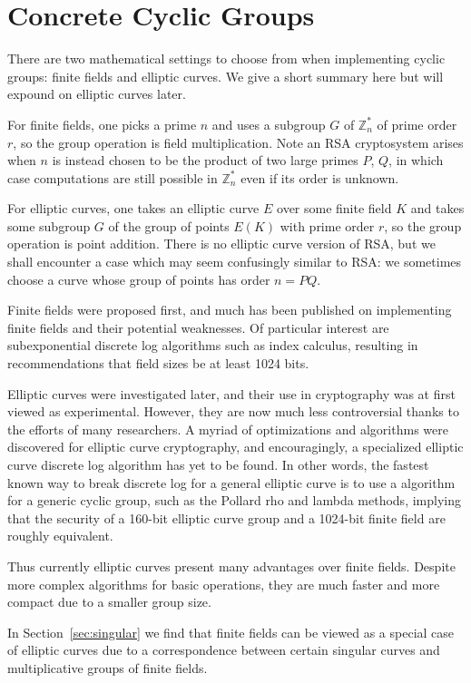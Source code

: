 \section{Concrete Cyclic Groups}

There are two mathematical settings to choose from
when implementing cyclic groups: finite fields and elliptic curves.
We give a short summary here but will expound on elliptic curves later.

For finite fields, one picks a prime $n$ and uses
a subgroup $G$ of $\mathbb{Z}_n^*$
of prime order $r$, so the group operation is field multiplication.
Note an RSA cryptosystem arises when $n$ is instead chosen to be the
product of two
large primes $P$, $Q$, in which case computations are still possible
in $\mathbb{Z}_n^*$ even if its order is unknown.

For elliptic curves, one takes an elliptic curve $E$ over some
finite field $K$ and takes some subgroup $G$ of the group of points
$E(K)$ with prime order $r$, so the group operation is point addition.
There is no elliptic curve version of RSA, but we shall encounter
a case which may seem confusingly similar to RSA: we sometimes choose
a curve whose group of points has order $n = PQ$.

Finite fields were proposed first, and much has been published
on implementing finite fields and their potential weaknesses.
Of particular interest are subexponential discrete log
algorithms such as index calculus, resulting in recommendations that
field sizes be at least 1024 bits.

Elliptic curves were investigated later, and their use in cryptography
was at first viewed as experimental. However, they are now much less
controversial thanks to the efforts of many researchers. A myriad
of optimizations
and algorithms were discovered for elliptic curve cryptography,
and encouragingly, a specialized elliptic curve discrete log algorithm
has yet to be found. In other words, the fastest known way to break discrete log
for a general elliptic curve is to use a algorithm for a generic
cyclic group, such as the Pollard rho and lambda methods, implying that the
security of a 160-bit elliptic curve group and a 1024-bit finite
field are roughly equivalent.

Thus currently elliptic curves present many advantages over finite fields.
Despite more complex algorithms for basic operations, they are much faster
and more compact due to a smaller group size.

In Section~\ref{sec:singular} we find that
finite fields can be viewed as a special case of elliptic
curves due to a correspondence between certain singular curves and
multiplicative groups of finite fields.

